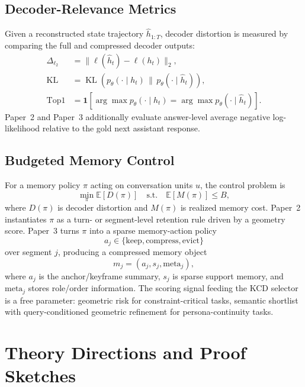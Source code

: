 \documentclass[conference]{IEEEtran}
\newcommand{\E}{\mathbb{E}}
\newcommand{\KL}{\operatorname{KL}}
\newcommand{\Logit}{\Delta_{\ell_2}}
\begin{document}
\subsection{Decoder-Relevance Metrics}
Given a reconstructed state trajectory $\widehat{h}_{1:T}$, decoder distortion is measured by comparing the full and compressed decoder outputs:
\begin{align}
\Logit &= \lVert \ell(\widehat{h}_t) - \ell(h_t) \rVert_2, \\
\KL &= \KL\!\left(p_\theta(\cdot \mid h_t)\, \| \, p_\theta(\cdot \mid \widehat{h}_t)\right), \\
\mathrm{Top1} &= \mathbf{1}\left[\arg\max p_\theta(\cdot \mid h_t) = \arg\max p_\theta(\cdot \mid \widehat{h}_t)\right].
\end{align}
Paper~2 and Paper~3 additionally evaluate answer-level average negative log-likelihood relative to the gold next assistant response.

\subsection{Budgeted Memory Control}
For a memory policy $\pi$ acting on conversation units $u$, the control problem is
\begin{equation}
\min_\pi \E\!\left[D(\pi)\right]
\quad
\text{s.t.}
\quad
\E\!\left[M(\pi)\right] \leq B,
\end{equation}
where $D(\pi)$ is decoder distortion and $M(\pi)$ is realized memory cost. Paper~2 instantiates $\pi$ as a turn- or segment-level retention rule driven by a geometry score. Paper~3 turns $\pi$ into a sparse memory-action policy
\begin{equation}
a_j \in \{\mathrm{keep}, \mathrm{compress}, \mathrm{evict}\}
\end{equation}
over segment $j$, producing a compressed memory object
\begin{equation}
m_j = (a_j, s_j, \mathrm{meta}_j),
\end{equation}
where $a_j$ is the anchor/keyframe summary, $s_j$ is sparse support memory, and $\mathrm{meta}_j$ stores role/order information. The scoring signal feeding the KCD selector is a free parameter: geometric risk for constraint-critical tasks, semantic shortlist with query-conditioned geometric refinement for persona-continuity tasks.

\section{Theory Directions and Proof Sketches}
\end{document}
